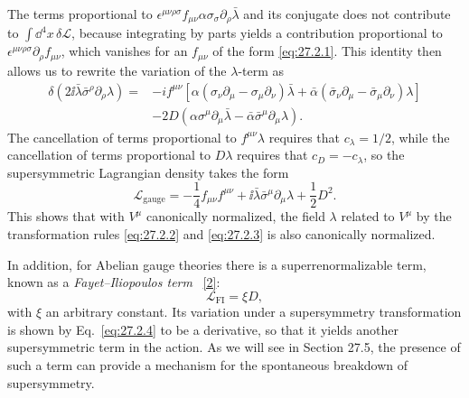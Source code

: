 The terms proportional to
\(\epsilon^{\mu\nu\rho\sigma}f_{\mu\nu}
\alpha\sigma_\sigma\partial_\rho\bar\lambda\) and its conjugate
does not contribute to \(\int \dd^4x\,\delta\mathcal{L}\), because
integrating by parts yields a contribution proportional to
\(\epsilon^{\mu\nu\rho\sigma}\partial_\rho f_{\mu\nu}\), which vanishes
for an \(f_{\mu\nu}\) of the form \eqref{eq:27.2.1}. This identity then
allows us to rewrite the variation of the \(\lambda\)-term as
\[
  \begin{aligned}
  \delta\!\left(2\ii\bar\lambda\bar\sigma^\rho
      \partial_\rho\lambda\right)
  ={}&-if^{\mu\nu}\left[
    \alpha(\sigma_\nu\partial_\mu-\sigma_\mu\partial_\nu)\bar\lambda
    +\bar\alpha(\bar\sigma_\nu\partial_\mu
      -\bar\sigma_\mu\partial_\nu)\lambda\right]
  \\
  &-2D\left(
    \alpha\sigma^\mu\partial_\mu\bar\lambda
    -\bar\alpha\bar\sigma^\mu\partial_\mu\lambda\right).
  \end{aligned}
\]
The cancellation of terms proportional to \(f^{\mu\nu}\lambda\) requires
that \(c_\lambda=1/2\), while the cancellation of terms proportional to
\(D\lambda\) requires that \(c_D=-c_\lambda\), so the supersymmetric
Lagrangian density takes the form
\begin{equation}
  \mathcal{L}_{\mathrm{gauge}}
  =-\frac14f_{\mu\nu}f^{\mu\nu}
  +\ii\bar\lambda\bar\sigma^\mu\partial_\mu\lambda
  +\frac12D^2.
  \tag{27.2.6}\label{eq:27.2.6}
\end{equation}
This shows that with \(V^\mu\) canonically normalized, the field
\(\lambda\) related to \(V^\mu\) by the transformation rules
\eqref{eq:27.2.2} and \eqref{eq:27.2.3} is also canonically normalized.

In addition, for Abelian gauge theories there is a superrenormalizable
term, known as a \textit{Fayet--Iliopoulos term}%
~\hyperref[ch27-ref-2]{[2]}:
\begin{equation}
  \mathcal{L}_{\mathrm{FI}}=\xi D,
  \tag{27.2.7}\label{eq:27.2.7}
\end{equation}
with \(\xi\) an arbitrary constant. Its variation under a supersymmetry
transformation is shown by Eq.~\eqref{eq:27.2.4} to be a derivative, so
that it yields another supersymmetric term in the action. As we will see
in Section 27.5, the presence of such a term can provide a mechanism for
the spontaneous breakdown of supersymmetry.

